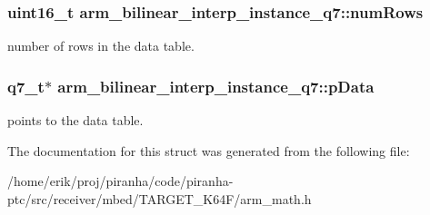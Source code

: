 \subsubsection[{\texorpdfstring{num\+Rows}{numRows}}]{\setlength{\rightskip}{0pt plus 5cm}uint16\+\_\+t arm\+\_\+bilinear\+\_\+interp\+\_\+instance\+\_\+q7\+::num\+Rows}\hypertarget{structarm__bilinear__interp__instance__q7_ad5a8067cab5f9ea4688b11a623e16607}{}\label{structarm__bilinear__interp__instance__q7_ad5a8067cab5f9ea4688b11a623e16607}
number of rows in the data table. 
\subsubsection[{\texorpdfstring{p\+Data}{pData}}]{\setlength{\rightskip}{0pt plus 5cm}q7\+\_\+t$\ast$ arm\+\_\+bilinear\+\_\+interp\+\_\+instance\+\_\+q7\+::p\+Data}\hypertarget{structarm__bilinear__interp__instance__q7_af05194d691bbefb02c34bafb22ca9ef0}{}\label{structarm__bilinear__interp__instance__q7_af05194d691bbefb02c34bafb22ca9ef0}
points to the data table. 

The documentation for this struct was generated from the following file\+:\begin{DoxyCompactItemize}
\item 
/home/erik/proj/piranha/code/piranha-\/ptc/src/receiver/mbed/\+T\+A\+R\+G\+E\+T\+\_\+\+K64\+F/arm\+\_\+math.\+h\end{DoxyCompactItemize}
